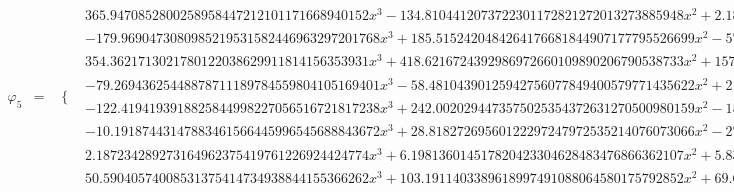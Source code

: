 \documentclass{article}
\begin{document}
\begin{landscape}
\begin{eqnarray*}
\begin{array}{cc}
\end{array}\\
\varphi_5 & = & \begin{array}{cc}
 \{ & 
\begin{array}{cc}
 365.9470852800258958447212101171668940152 x^3-134.8104412073722301172821272013273885948 x^2+2.188816056270514020000892101364896783909 & x\geq 0\land x<\frac{1}{4} \\
 -179.9690473080985219531582446963297201768 x^3+185.5152420484264176681844907177795526699 x^2-57.80356676762599555563091118202285547134 x+5.149292116379041450408822758387311419452 & x\geq \frac{1}{4}\land x<\frac{1}{2} \\
 354.3621713021780122038629911814156353931 x^3+418.6216724392986972660109890206790538733 x^2+157.2454317534040375416895846170902552859 x+18.45674809140955934305770864116167332678 & x\geq -\frac{1}{2}\land x<-\frac{1}{4} \\
 -79.26943625448878711189784559804105169401 x^3-58.48104390125942756077849400579771435622 x^2+2.188816056270514020000892101364896783909 & x\geq -\frac{1}{4}\land x<0 \\
 -122.4194193918825844998227056516721817238 x^3+242.0020294473575025354372631270500980159 x^2-157.4525751037190335128853378747865546571 x+33.65839594516579703055590062186933236921 & x\geq \frac{1}{2}\land x<\frac{3}{4} \\
 -10.19187443147883461566445996545688843672 x^3+28.81827269560122297247972535214076073066 x^2-27.06092209676594209796607080791085615116 x+8.434523832643553741150805421226983857219 & x\geq \frac{3}{4}\land x<1 \\
 2.187234289273164962375419761226924424774 x^3+6.198136014517820423304628483476866362107 x^2+5.834569161216145959482997683272959449892 x+1.823667435971490498553788961023017512559 & x\geq -1\land x<-\frac{3}{4} \\
 50.59040574008531375414734938844155366262 x^3+103.1911403389618997491088064580175792852 x^2+69.64372382463676386207413339915934199571 x+15.54205645684853457626107344873982511238 & x\geq -\frac{3}{4}\land x<-\frac{1}{2}
\end{array}


\end{array}
\end{eqnarray*}
\end{landscape}
\end{document}
